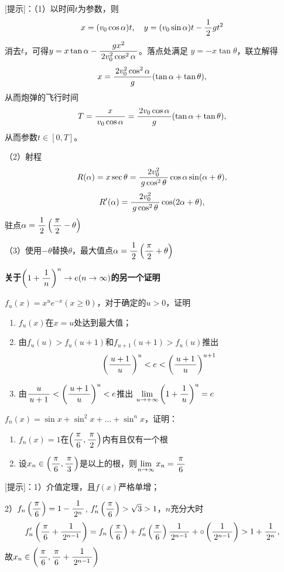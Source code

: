 [提示]：（1）以时间$t$为参数，则
$$x=(v_0\cos\alpha)t,\quad y=(v_0\sin\alpha)t-\df12gt^2$$
消去$t$，可得$y=x\tan\alpha-\df{gx^2}{2v_0^2\cos^2\alpha}$。落点处满足
$y=-x\tan\theta$，联立解得
$$x=\df{2v_0^2\cos^2\alpha}g(\tan\alpha+\tan\theta),$$
从而炮弹的飞行时间
$$T=\df x{v_0\cos\alpha}=\df{2v_0\cos\alpha}g(\tan\alpha+\tan\theta),$$
从而参数$t\in[0,T]$。

（2）射程
$$R(\alpha)=x\sec\theta=\df{2v_0^2}{g\cos^2\theta}\cos\alpha\sin(\alpha+\theta),$$
$$R'(\alpha)=\df{2v_0^2}{g\cos^2\theta}\cos(2\alpha+\theta),$$
驻点$\alpha=\df12\left(\df{\pi}2-\theta\right)$

（3）使用$-\theta$替换$\theta$，最大值点$\alpha=\df12\left(\df{\pi}2+\theta\right)$

\begin{shaded}
{\bf 关于$\left(1+\df1n\right)^n\to e(n\to\infty)$的另一个证明}

\egz $f_u(x)=x^ue^{-x}(x\geq0)$，对于确定的$u>0$，证明
\begin{enumerate}[(1)]
  \setlength{\itemindent}{1cm}
  \item $f_u(x)$在$x=u$处达到最大值；
  \item 由$f_u(u)>f_u(u+1)$和$f_{u+1}(u+1)>f_u(u)$推出
  $$\left(\df{u+1}u\right)^u<e<\left(\df{u+1}u\right)^{u+1}$$
  \item 由$\df{u}{u+1}<\left(\df{u+1}u\right)^u<e$推出
  $\lim\limits_{u\to+\infty}\left(1+\df1u\right)^u=e$
\end{enumerate}
\end{shaded}

% 

% 

\egz $f_n(x)=\sin x+\sin^2x+\ldots+\sin^nx$，证明：
\begin{enumerate}[1)]
  \setlength{\itemindent}{1cm}
  \item $f_n(x)=1$在$\left(\df{\pi}6,\df{\pi}2\right)$内有且仅有一个根
  \item 设$x_n\in\left(\df{\pi}6,\df{\pi}3\right)$是以上的根，则$\limn x_n=\df{\pi}6$
\end{enumerate}

[提示]：1）介值定理，且$f(x)$严格单增；

2）$f_n\left(\df{\pi}{6}\right)=1-\df1{2^n}$,
$f'_n\left(\df{\pi}{6}\right)>\sqrt
3>1$，$n$充分大时 $$f'_n\left(\df{\pi}{6}+\df1{2^{n-1}}\right)
=f_n\left(\df{\pi}{6}\right)+f'_n\left(\df{\pi}{6}\right)\df1{2^{n-1}}
+\circ\left(\df1{2^{n-1}}\right)>1+\df1{2^n},$$
故$x_n\in\left(\df{\pi}{6},\df{\pi}{6}+\df1{2^{n-1}}\right)$

